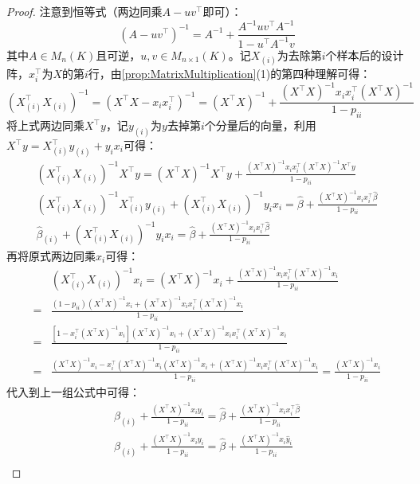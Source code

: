 \begin{proof}
	注意到恒等式（两边同乘$A-uv^{\top}$即可）：
	\begin{equation*}
		(A-uv^{\top})^{-1}=A^{-1}+\frac{A^{-1}uv^{\top}A^{-1}}{1-u^{\top}A^{-1}v}
	\end{equation*}
	其中$A\in M_{n}(K)$且可逆，$u,v\in M_{n\times 1}(K)$。记$X_{(i)}$为去除第$i$个样本后的设计阵，$x_i^{\top}$为$X$的第$i$行，由\cref{prop:MatrixMultiplication}(1)的第四种理解可得：
	\begin{equation*}
		(X_{(i)}^{\top}X_{(i)})^{-1}=(X^{\top}X-x_ix_i^{\top})^{-1}=(X^{\top}X)^{-1}+\frac{(X^{\top}X)^{-1}x_ix_i^{\top}(X^{\top}X)^{-1}}{1-p_{ii}}
	\end{equation*}
	将上式两边同乘$X^{\top}y$，记$y_{(i)}$为$y$去掉第$i$个分量后的向量，利用$X^{\top}y=X_{(i)}^{\top}y_{(i)}+y_ix_i$可得：
	\begin{gather*}
		(X_{(i)}^{\top}X_{(i)})^{-1}X^{\top}y=(X^{\top}X)^{-1}X^{\top}y+\frac{(X^{\top}X)^{-1}x_ix_i^{\top}(X^{\top}X)^{-1}X^{\top}y}{1-p_{ii}} \\
		(X_{(i)}^{\top}X_{(i)})^{-1}X_{(i)}^{\top}y_{(i)}+(X_{(i)}^{\top}X_{(i)})^{-1}y_ix_i=\hat{\beta}+\frac{(X^{\top}X)^{-1}x_ix_i^{\top}\hat{\beta}}{1-p_{ii}} \\
		\hat{\beta}_{(i)}+(X_{(i)}^{\top}X_{(i)})^{-1}y_ix_i=\hat{\beta}+\frac{(X^{\top}X)^{-1}x_ix_i^{\top}\hat{\beta}}{1-p_{ii}}
	\end{gather*}
	再将原式两边同乘$x_i$可得：
	\begin{align*}
		&(X_{(i)}^{\top}X_{(i)})^{-1}x_i=(X^{\top}X)^{-1}x_i+\frac{(X^{\top}X)^{-1}x_ix_i^{\top}(X^{\top}X)^{-1}x_i}{1-p_{ii}} \\
		=&\frac{(1-p_{ii})(X^{\top}X)^{-1}x_i+(X^{\top}X)^{-1}x_ix_i^{\top}(X^{\top}X)^{-1}x_i}{1-p_{ii}} \\
		=&\frac{[1-x_i^{\top}(X^{\top}X)^{-1}x_i](X^{\top}X)^{-1}x_i+(X^{\top}X)^{-1}x_ix_i^{\top}(X^{\top}X)^{-1}x_i}{1-p_{ii}} \\
		=&\frac{(X^{\top}X)^{-1}x_i-x_i^{\top}(X^{\top}X)^{-1}x_i(X^{\top}X)^{-1}x_i+(X^{\top}X)^{-1}x_ix_i^{\top}(X^{\top}X)^{-1}x_i}{1-p_{ii}}=\frac{(X^{\top}X)^{-1}x_i}{1-p_{ii}}
	\end{align*}
	代入到上一组公式中可得：
	\begin{gather*}
		\hat{\beta}_{(i)}+\frac{(X^{\top}X)^{-1}x_iy_i}{1-p_{ii}}=\hat{\beta}+\frac{(X^{\top}X)^{-1}x_ix_i^{\top}\hat{\beta}}{1-p_{ii}} \\
		\hat{\beta}_{(i)}+\frac{(X^{\top}X)^{-1}x_iy_i}{1-p_{ii}}=\hat{\beta}+\frac{(X^{\top}X)^{-1}x_i\hat{y}_i}{1-p_{ii}} \\

\end{gather*}
\end{proof}
